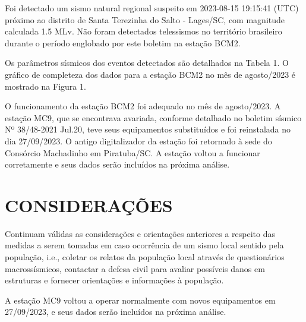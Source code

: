 Foi detectado um sismo natural regional suspeito em 2023-08-15 19:15:41 (UTC) próximo ao distrito de Santa Terezinha do Salto - Lages/SC, com magnitude calculada 1.5 MLv. Não foram detectados telessismos no território brasileiro durante o período englobado por este boletim na estação BCM2.

Os parâmetros sísmicos dos eventos detectados são detalhados na Tabela 1. O gráfico de completeza dos dados para a estação BCM2 no mês de agosto/2023 é mostrado na Figura 1.

O funcionamento da estação BCM2 foi adequado no mês de agosto/2023. A estação MC9, que se encontrava avariada, conforme detalhado no boletim sísmico Nº 38/48-2021 Jul.20, teve seus equipamentos substituídos e foi reinstalada no dia 27/09/2023. O antigo digitalizador da estação foi retornado à sede do Consórcio Machadinho em Piratuba/SC. A estação voltou a funcionar corretamente e seus dados serão incluídos na próxima análise.

\section{CONSIDERAÇÕES}
\label{sec:consideracoes}
Continuam válidas as considerações e orientações anteriores a respeito das medidas a serem tomadas em caso ocorrência de um sismo local sentido pela população, i.e., coletar os relatos da população local através de questionários macrossísmicos, contactar a defesa civil para avaliar possíveis danos em estruturas e fornecer orientações e informações à população.

A estação MC9 voltou a operar normalmente com novos equipamentos em 27/09/2023, e seus dados serão incluídos na próxima análise.

\assinaturaLucas
\clearpage
\newpage
